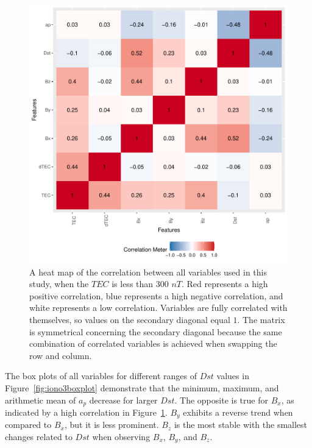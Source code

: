 \documentclass[sn-mathphys-num]{sn-jnl}%
\begin{document}
\begin{figure}
 \centering
 \includegraphics[width=0.9\linewidth]{iono3correlation.pdf}
    \caption{A heat map of the correlation between all variables used in this study, when the $TEC$ is less than $300$ $nT$. Red represents a high positive correlation, blue represents a high negative correlation, and white represents a low correlation. Variables are fully correlated with themselves, so values on the secondary diagonal equal $1$. The matrix is symmetrical concerning the secondary diagonal because the same combination of correlated variables is achieved when swapping the row and column.}
    \label{fig:correlation}
\end{figure}

The box plots of all variables for different ranges of $Dst$ values in Figure~\ref{fig:iono3boxplot} demonstrate that the minimum, maximum, and arithmetic mean of $a_{p}$ decrease for larger $Dst$. The opposite is true for $B_{x}$, as indicated by a high correlation in Figure~\ref{fig:correlation}. $B_{y}$ exhibits a reverse trend when compared to $B_{x}$, but it is less prominent. $B_{z}$ is the most stable with the smallest changes related to $Dst$ when observing $B_{x}$, $B_{y}$, and $B_{z}$.
\end{document}

